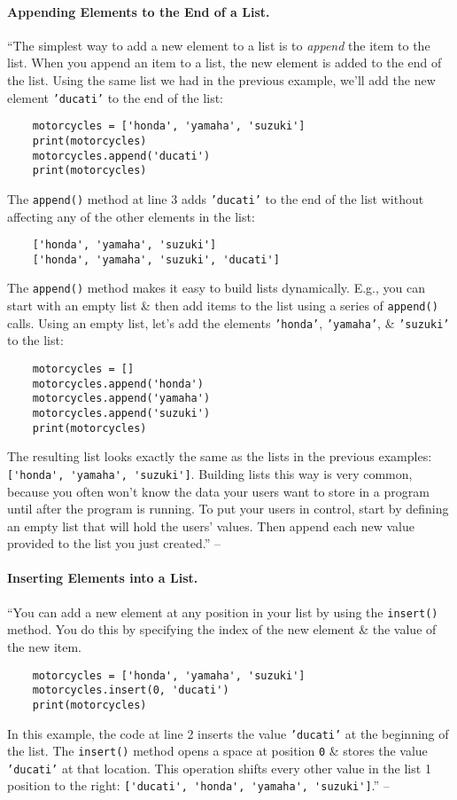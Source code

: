 \documentclass[oneside]{book}
\numberwithin{equation}{section}
\begin{document}
\paragraph{Appending Elements to the End of a List.} ``The simplest way to add a new element to a list is to \textit{append} the item to the list. When you append an item to a list, the new element is added to the end of the list. Using the same list we had in the previous example, we'll add the new element \texttt{'ducati'} to the end of the list:
\begin{verbatim}
	motorcycles = ['honda', 'yamaha', 'suzuki']
	print(motorcycles)
	motorcycles.append('ducati')
	print(motorcycles)
\end{verbatim}
The \texttt{append()} method at line 3 adds \texttt{'ducati'} to the end of the list without affecting any of the other elements in the list:
\begin{verbatim}
	['honda', 'yamaha', 'suzuki']
	['honda', 'yamaha', 'suzuki', 'ducati']
\end{verbatim}
The \texttt{append()} method makes it easy to build lists dynamically. E.g., you can start with an empty list \& then add items to the list using a series of \texttt{append()} calls. Using an empty list, let's add the elements \texttt{'honda'}, \texttt{'yamaha'}, \& \texttt{'suzuki'} to the list:
\begin{verbatim}
	motorcycles = []
	motorcycles.append('honda')
	motorcycles.append('yamaha')
	motorcycles.append('suzuki')
	print(motorcycles)
\end{verbatim}
The resulting list looks exactly the same as the lists in the previous examples: \verb|['honda', 'yamaha', 'suzuki']|. Building lists this way is very common, because you often won't know the data your users want to store in a program until after the program is running. To put your users in control, start by defining an empty list that will hold the users' values. Then append each new value provided to the list you just created.'' -- \cite[pp. 37--38]{Matthes2019}

\paragraph{Inserting Elements into a List.} ``You can add a new element at any position in your list by using the \texttt{insert()} method. You do this by specifying the index of the new element \& the value of the new item.
\begin{verbatim}
	motorcycles = ['honda', 'yamaha', 'suzuki']
	motorcycles.insert(0, 'ducati')
	print(motorcycles)
\end{verbatim}
In this example, the code at line 2 inserts the value \texttt{'ducati'} at the beginning of the list. The \texttt{insert()} method opens a space at position \texttt{0} \& stores the value \texttt{'ducati'} at that location. This operation shifts every other value in the list 1 position to the right: \verb|['ducati', 'honda', 'yamaha', 'suzuki']|.'' -- \cite[p. 38]{Matthes2019}
\end{document}
